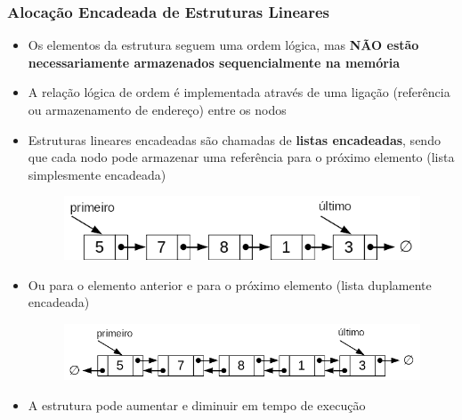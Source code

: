\documentclass[aspectratio=169]{beamer}
\begin{document}
\begin{frame}\frametitle{Alocação Encadeada de Estruturas Lineares}
\begin{itemize}
	\item Os elementos da estrutura seguem uma ordem lógica, mas \textbf{NÃO estão necessariamente armazenados sequencialmente na memória}
	\item A relação lógica de ordem é implementada através de uma ligação (referência ou armazenamento de endereço) entre os nodos
	\item Estruturas lineares encadeadas são chamadas de \textbf{listas encadeadas}, sendo que cada nodo pode armazenar uma referência para o próximo elemento (lista simplesmente encadeada)
\begin{figure}[h]
	\centering
	\includegraphics[height=0.15\paperheight]{imagens/lista_simplesmente_encadeada.png}
\end{figure}
	\item Ou para o elemento anterior e para o próximo elemento (lista duplamente encadeada)
\begin{figure}[h]
	\centering
	\includegraphics[height=0.16\paperheight]{imagens/lista_duplamente_encadeada.png}
\end{figure}
	\item A estrutura pode aumentar e diminuir em tempo de execução
\end{itemize}
\end{frame}
\end{document}
